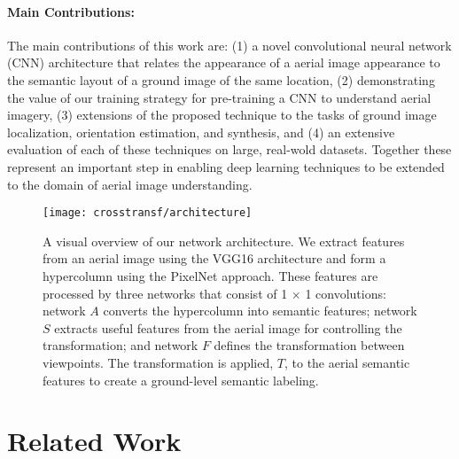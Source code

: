 \paragraph{Main Contributions:} The main contributions of this work
are: (1)  a novel convolutional neural network (CNN) architecture that
relates the appearance of a aerial image appearance to the semantic
layout of a ground image of the same location, (2) demonstrating
the value of our training strategy for pre-training a CNN to
understand aerial imagery, (3) extensions of the proposed technique to
the tasks of ground image localization, orientation estimation,
and synthesis, and (4) an extensive evaluation of each of these
techniques on large, real-wold datasets.  Together these represent an
important step in enabling deep learning techniques to be extended to
the domain of aerial image understanding. 

\begin{figure*}
	\centering
	\texttt{[image: crosstransf/architecture]}

  \caption{A visual overview of our network architecture. We extract
    features from an aerial image using the VGG16 architecture and
    form a hypercolumn using the PixelNet approach. These features are
    processed by three networks that consist of 1 $\times$ 1
    convolutions: network $A$ converts the hypercolumn into semantic
    features; network $S$ extracts useful features from the aerial
    image for controlling the transformation; and network $F$ 
    defines the transformation between viewpoints.  The
  transformation is applied, $T$, to the aerial semantic features to
create a ground-level semantic labeling.  }

	\label{fig:architecture}
\end{figure*}

\section{Related Work}


